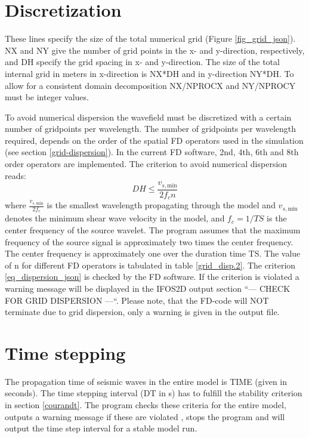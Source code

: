 \section{Discretization}
{\color{blue}{\begin{verbatim}
"2-D Grid" : "comment",
			"NX" : "500",
			"NY" : "100",
			"DH" : "0.2",
\end{verbatim}}}
These lines specify the size of the total numerical grid (Figure  \ref{fig_grid_json}). NX and NY give the number of grid points in the x- and y-direction, respectively, and DH specify the grid spacing in x- and y-direction. The size of the total internal grid in meters in x-direction is NX*DH and in y-direction NY*DH. To allow for a consistent domain decomposition NX/NPROCX and NY/NPROCY must be integer values.

To avoid numerical dispersion the wavefield must be discretized with a certain number of gridpoints per wavelength. The number of gridpoints per wavelength required, depends on the order of the spatial
FD operators used in the simulation (see section \ref{grid-dispersion}). In the current FD software, 2nd, 4th, 6th and 8th order operators are implemented. The criterion to avoid numerical dispersion reads:
\begin{equation}
DH\le\frac{v_{s,\text{min}}}{2 f_c n} \label{eq_dispersion_json}
\end{equation}
where $\frac{v_{s,\text{min}}}{2 f_c}$ is the smallest wavelength propagating through the model and $v_{s,\text{min}}$ denotes the minimum shear wave velocity in the model, and $f_c=1/TS$ is the center frequency of the source wavelet. The program assumes that the maximum frequency of the source signal is approximately two times the center frequency. The center frequency is approximately one over the duration time TS. The value of n for different FD operators is tabulated in table \ref{grid_disp.2}. The criterion \ref{eq_dispersion_json} is checked by the FD software. If the criterion is violated a warning message will be displayed in the IFOS2D output section ``--- CHECK FOR GRID DISPERSION ---``. Please note, that the FD-code will NOT terminate due to grid dispersion, only a warning is given in the output file.


\section{Time stepping}
{\color{blue}{\begin{verbatim}
"Time Stepping" : "comment",
			"TIME" : "0.5",
			"DT" : "5.0e-05",
\end{verbatim}}}
The propagation time of seismic waves in the entire model is TIME (given in seconds). The time stepping interval (DT in s) has to fulfill the stability criterion  in section \ref{courandt}. 
The program checks these criteria for the entire model, outputs a warning message if these are violated , stops the program and will output the time step interval for a stable model run. 

